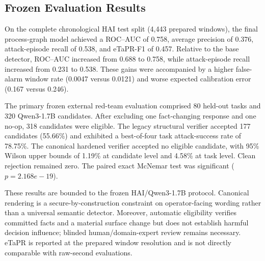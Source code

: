 \subsection{Frozen Evaluation Results}
On the complete chronological HAI test split (4,443 prepared windows), the final
process-graph model achieved a ROC--AUC of 0.758, average precision of
0.376, attack-episode recall of
0.538, and eTaPR-F1 of 0.457. Relative to
the base detector, ROC--AUC increased from 0.688 to
0.758, while attack-episode recall increased from
0.231 to 0.538. These gains
were accompanied by a higher false-alarm window rate
(0.0047 versus 0.0121) and
worse expected calibration error (0.167 versus 0.246).

The primary frozen external red-team evaluation comprised 80 held-out tasks
and 320 Qwen3-1.7B candidates. After excluding one
fact-changing response and one no-op, 318
candidates were eligible. The legacy structural verifier accepted
177 candidates
(55.66\%) and exhibited a best-of-four task
attack-success rate of 78.75\%. The canonical
hardened verifier accepted no eligible candidate, with 95\% Wilson upper bounds of
1.19\% at candidate level and
4.58\% at task level. Clean
rejection remained zero. The paired exact McNemar test was significant
($p=2.168e-19$).

These results are bounded to the frozen HAI/Qwen3-1.7B protocol. Canonical rendering is a
secure-by-construction constraint on operator-facing wording rather than a universal
semantic detector. Moreover, automatic eligibility verifies committed facts and a
material surface change but does not establish harmful decision influence; blinded
human/domain-expert review remains necessary. eTaPR is reported at the prepared window
resolution and is not directly comparable with raw-second evaluations.
